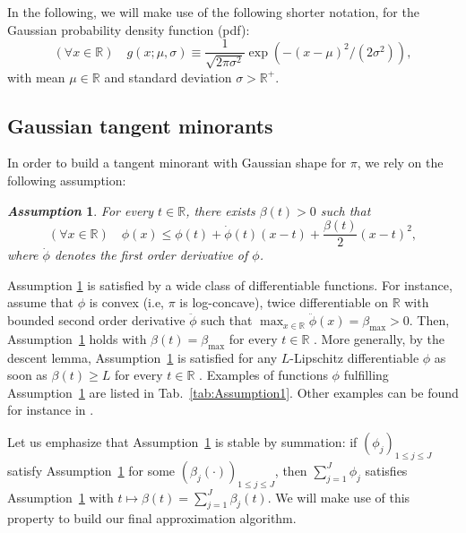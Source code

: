 \documentclass[review]{elsarticle}
\newtheorem{assumption}{\em Assumption}
\newcommand{\bR}{\mathbb{R}}
\begin{document}
In the following, we will make use of the following shorter notation, for the Gaussian probability density function (pdf):
\begin{equation}
(\forall x \in \bR) \quad g(x;\mu,\sigma) \equiv \frac{1}{\sqrt{2 \pi \sigma^2}}\exp\left(-(x - \mu)^2/(2 \sigma^2) \right),
\end{equation}
with mean $\mu \in \bR$ and standard deviation $\sigma > \bR^+$. 
\subsection{Gaussian tangent minorants}
In order to build a tangent minorant with Gaussian shape for $\pi$, we rely on the following assumption:

\begin{assumption}
\label{assump1}
For every $t \in \mathbb{R}$, there exists $\beta(t) > 0$ such that 
\begin{equation}
(\forall x \in \mathbb{R}) \quad \phi(x) \leq \phi(t) + \dot{\phi}(t) (x-t) + \frac{\beta(t)}{2} (x-t)^2,
\end{equation}
where $\dot{\phi}$ denotes the first order derivative of $\phi$. 
\end{assumption}

Assumption \ref{assump1} is satisfied by a wide class of differentiable functions. For instance, assume that $\phi$ is convex (i.e, $\pi$ is log-concave), twice differentiable on $\bR$ with bounded second order derivative $\ddot{\phi}$ such that $\max_{x \in \bR} \ddot{\phi}(x) = \beta_{\max} > 0$. Then, Assumption~\ref{assump1} holds with $\beta(t) = \beta_{\max}$ for every $t \in \bR$ \cite{Bauschke2017}. More generally, by the descent lemma, Assumption~\ref{assump1} is satisfied for any $L$-Lipschitz differentiable $\phi$ as soon as $\beta(t) \geq L$ for every $t \in \bR$ \cite{Bauschke2017}. Examples of functions $\phi$ fulfilling Assumption~\ref{assump1} are listed in Tab.~\ref{tab:Assumption1}. Other examples can be found for instance in \cite{Sun2017,chouzenoux:hal-00789962}. 

Let us emphasize that Assumption~\ref{assump1} is stable by summation: if $(\phi_j)_{1 \leq j \leq J}$ satisfy Assumption~\ref{assump1} for some $(\beta_j(\cdot))_{1 \leq j \leq J}$, then $\sum_{j=1}^J \phi_j$ satisfies Assumption~\ref{assump1} with $t \mapsto \beta(t) = \sum_{j=1}^J \beta_j(t)$. We will make use of this property to build our final approximation algorithm.
\end{document}

